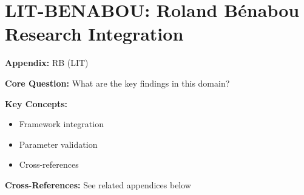

\chapter{LIT-BENABOU: Roland Bénabou Research Integration}
\label{app:lit-benabou}


\begin{tcolorbox}[colback=blue!5!white, colframe=blue!75!black,
    title=Quick Reference: Appendix RB]

\textbf{Appendix:} RB (LIT)

\textbf{Core Question:} What are the key findings in this domain?

\textbf{Key Concepts:}
\begin{itemize}[nosep]
\item Framework integration
\item Parameter validation
\item Cross-references
\end{itemize}

\textbf{Cross-References:} See related appendices below
\end{tcolorbox}

